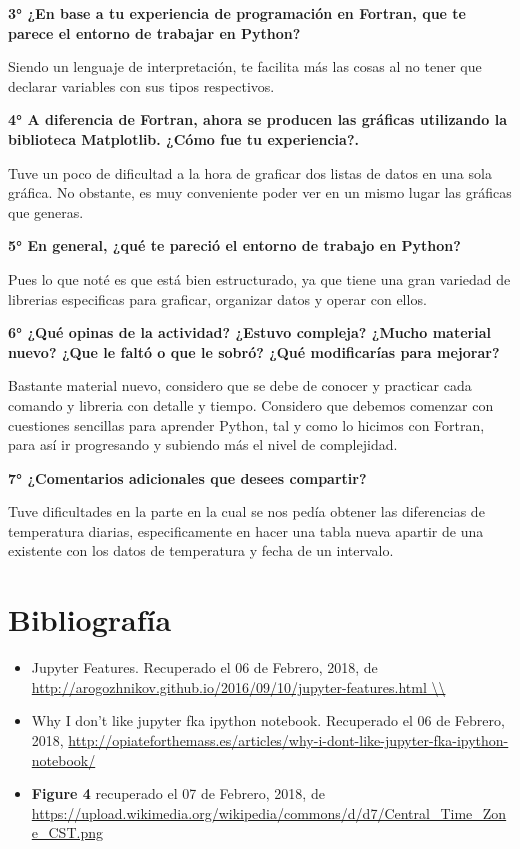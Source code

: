 \documentclass[a4paper]{article}
\begin{document}
\textbf{3° ¿En base a tu experiencia de programación en Fortran, que te parece el entorno de trabajar en Python?}

Siendo un lenguaje de interpretación, te facilita más las cosas al no tener que declarar variables con sus tipos respectivos. 

\textbf{4° A diferencia de Fortran, ahora se producen las gráficas utilizando la biblioteca Matplotlib. ¿Cómo fue tu experiencia?.} 

Tuve un poco de dificultad a la hora de graficar dos listas de datos en una sola gráfica. No obstante, es muy conveniente poder ver en un mismo lugar las gráficas que generas. 

\textbf{5° En general, ¿qué te pareció el entorno de trabajo en Python?}

Pues lo que noté es que está bien estructurado, ya que tiene una gran variedad de librerias especificas para graficar, organizar datos y operar con ellos. 

\textbf{6° ¿Qué opinas de la actividad? ¿Estuvo compleja? ¿Mucho material nuevo? ¿Que le faltó o que le sobró? ¿Qué modificarías para mejorar?}

Bastante material nuevo, considero que se debe de conocer y practicar cada comando y libreria con detalle y tiempo. Considero que debemos comenzar con cuestiones sencillas para aprender Python, tal y como lo hicimos con Fortran, para así ir progresando y subiendo más el nivel de complejidad.

\textbf{7° ¿Comentarios adicionales que desees compartir?}

Tuve dificultades en la parte en la cual se nos pedía obtener las diferencias de temperatura diarias, especificamente en hacer una tabla nueva apartir de una existente con los datos de temperatura y fecha de un intervalo. 


\section{Bibliografía}
\begin{itemize}
  \item Jupyter Features.  Recuperado el 06 de Febrero, 2018, de \url{http://arogozhnikov.github.io/2016/09/10/jupyter-features.html \\}
  \item Why I don't like jupyter fka ipython notebook.  Recuperado el 06 de Febrero, 2018, \url{http://opiateforthemass.es/articles/why-i-dont-like-jupyter-fka-ipython-notebook/}
  \item {\bf Figure 4} recuperado el 07 de Febrero, 2018, de
\url{https://upload.wikimedia.org/wikipedia/commons/d/d7/Central_Time_Zone_CST.png}
\end{itemize} 
\end{document}
